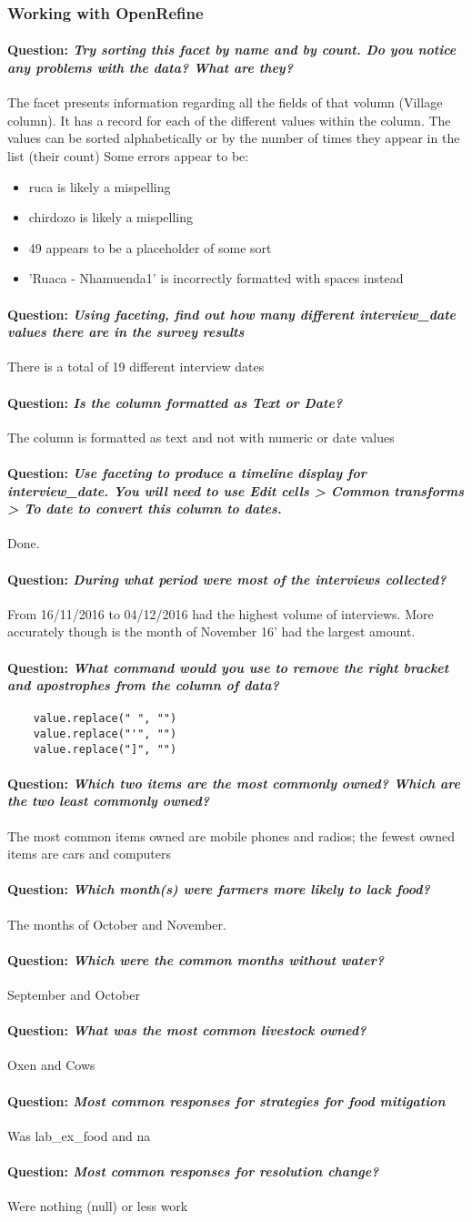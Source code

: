 \documentclass[12pt]{article}
\newcounter{problem} \setcounter{problem}{1}
\newcommand{\question}[1]{\paragraph{Question: {\textnormal{\textit{#1}}} ~\\}}
\begin{document}
\subsubsection{Working with OpenRefine}
\question{Try sorting this facet by name and by count. Do you notice any problems with the data? What are they?}
The facet presents information regarding all the fields of that volumn (Village column). It has a record for each of the different values within the column. The values can be sorted alphabetically or by the number of times they appear in the list (their count)
\newline
Some errors appear to be:
\begin{itemize}
    \item ruca is likely a mispelling
    \item chirdozo is likely a mispelling
    \item 49 appears to be a placeholder of some sort
    \item 'Ruaca - Nhamuenda1' is incorrectly formatted with spaces instead
\end{itemize}
\question{Using faceting, find out how many different interview_date values there are in the survey results}
There is a total of 19 different interview dates
\question{Is the column formatted as Text or Date?}
The column is formatted as text and not with numeric or date values
\question{Use faceting to produce a timeline display for interview_date. You will need to use Edit cells > Common transforms > To date to convert this column to dates.}
Done.
\question{During what period were most of the interviews collected?}
From 16/11/2016 to 04/12/2016 had the highest volume of interviews. More accurately though is the month of November 16' had the largest amount.
\question{What command would you use to remove the right bracket and apostrophes from the column of data?}
\begin{verbatim}
    value.replace(" ", "")
    value.replace("'", "")
    value.replace("]", "")
\end{verbatim}
\question{Which two items are the most commonly owned? Which are the two least commonly owned?}
The most common items owned are mobile phones and radios; the fewest owned items are cars and computers
\question{Which month(s) were farmers more likely to lack food?}
The months of October and November.
\question{Which were the common months without water?}
September and October
\question{What was the most common livestock owned?}
Oxen and Cows
\question{Most common responses for strategies for food mitigation}
Was lab\_ex\_food and na
\question{Most common responses for resolution change?}
Were nothing (null) or less work
\end{document}
